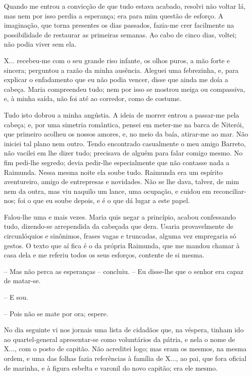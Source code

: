 Quando me entrou a convicção de que tudo estava acabado, resolvi não
voltar lá, mas nem por isso perdia a esperança; era para mim questão de
esforço. A imaginação, que torna presentes os dias passados, fazia-me
crer facilmente na possibilidade de restaurar as primeiras semanas. Ao
cabo de cinco dias, voltei; não podia viver sem ela.

X... recebeu-me com o seu grande riso infante, os olhos puros, a mão
forte e sincera; perguntou a razão da minha ausência. Aleguei uma
febrezinha, e, para explicar o enfadamento que eu não podia vencer,
disse que ainda me doía a cabeça. Maria compreendeu tudo; nem por isso
se mostrou meiga ou compassiva, e, à minha saída, não foi até ao
corredor, como de costume.

Tudo isto dobrou a minha angústia. A ideia de morrer entrou a passar-me
pela cabeça; e, por uma simetria romântica, pensei em meter-me na barca
de Niterói, que primeiro acolheu os nossos amores, e, no meio da baía,
atirar-me ao mar. Não iniciei tal plano nem outro. Tendo encontrado
casualmente o meu amigo Barreto, não vacilei em lhe dizer tudo;
precisava de alguém para falar comigo mesmo. No fim pedi-lhe segredo;
devia pedir-lhe especialmente que não contasse nada a Raimunda. Nessa
mesma noite ela soube tudo. Raimunda era um espírito aventureiro, amigo
de entrepresas e novidades. Não se lhe dava, talvez, de mim nem da
outra, mas viu naquilo um lance, uma ocupação, e cuidou em
reconciliar-nos; foi o que eu soube depois, e é o que dá lugar a este
papel.

Falou-lhe uma e mais vezes. Maria quis negar a princípio, acabou
confessando tudo, dizendo-se arrependida da cabeçada que dera. Usaria
provavelmente de circunlóquios e sinônimos, frases vagas e truncadas,
alguma vez empregaria só gestos. O texto que aí fica é o da própria
Raimunda, que me mandou chamar à casa dela e me referiu todos os seus
esforços, contente de si mesma.

-- Mas não perca as esperanças -- concluiu. -- Eu disse-lhe que o senhor
era capaz de matar-se.

-- E sou.

-- Pois não se mate por ora; espere.

No dia seguinte vi nos jornais uma lista de cidadãos que, na véspera,
tinham ido ao quartel-general apresentar-se como voluntários da pátria,
e nela o nome de X..., com o posto de capitão. Não acreditei logo; mas
eram os mesmos, na mesma ordem, e uma das folhas fazia referências à
família de X..., ao pai, que fora oficial de marinha, e à figura esbelta
e varonil do novo capitão; era ele mesmo.

